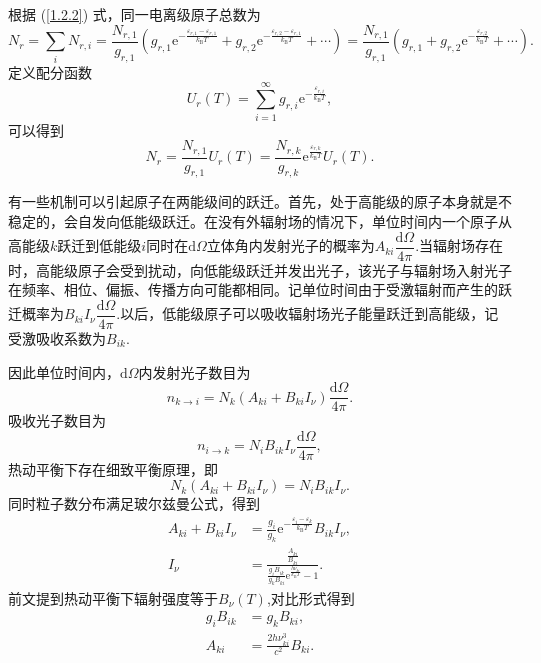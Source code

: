 \documentclass[../天体物理基础.tex]{subfiles}
\begin{document}
根据 (\ref{1.2.2}) 式，同一电离级原子总数为
\begin{equation}
N_{r}=\sum_{i}N_{r,i}=\frac{N_{r,1}}{g_{r,1}}\left(g_{r,1}\mathrm{e}^{-\frac{\varepsilon_{r,1}-\varepsilon_{r,1}}{k_{\text{B}}T}}+g_{r,2}\mathrm{e}^{-\frac{\varepsilon_{r,2}-\varepsilon_{r,1}}{k_{\text{B}}T}}+\cdots\right)=\frac{N_{r,1}}{g_{r,1}}\left(g_{r,1}+g_{r,2}\mathrm{e}^{-\frac{\varepsilon_{r,2}}{k_{\text{B}}T}}+\cdots\right).
\end{equation}
定义配分函数
\begin{equation}
U_r(T)=\sum_{i=1}^\infty g_{r,i}\mathrm{e}^{-\frac{\varepsilon_{r,i}}{k_{\text{B}}T}},
\end{equation}
可以得到
\begin{equation}
N_{r}=\frac{N_{r,1}}{g_{r,1}}U_r(T)=\frac{N_{r,k}}{g_{r,k}}\mathrm{e}^{\frac{\varepsilon_{r,k}}{k_{\text{B}}T}}U_r(T).
\end{equation}

有一些机制可以引起原子在两能级间的跃迁。首先，处于高能级的原子本身就是不稳定的，会自发向低能级跃迁。在没有外辐射场的情况下，单位时间内一个原子从高能级$k$跃迁到低能级$i$同时在$\mathrm{d}\Omega$立体角内发射光子的概率为$A_{ki}\dfrac{\mathrm{d}\Omega}{4\pi}$.当辐射场存在时，高能级原子会受到扰动，向低能级跃迁并发出光子，该光子与辐射场入射光子在频率、相位、偏振、传播方向可能都相同。记单位时间由于受激辐射而产生的跃迁概率为$B_{ki}I_{\nu}\dfrac{\mathrm{d}\Omega}{4\pi}$.以后，低能级原子可以吸收辐射场光子能量跃迁到高能级，记受激吸收系数为$B_{ik}$.

因此单位时间内，$\mathrm{d}\Omega$内发射光子数目为
\begin{equation}
n_{k\to i}=N_k(A_{ki}+B_{ki}I_\nu)\frac{\mathrm{d}\Omega}{4\pi}.
\end{equation}
吸收光子数目为
\begin{equation}
n_{i\to k}=N_iB_{ik}I_\nu\frac{\mathrm{d}\Omega}{4\pi},
\end{equation}
热动平衡下存在细致平衡原理，即
\begin{equation}
N_k(A_{ki}+B_{ki}I_\nu)=N_iB_{ik}I_\nu.
\end{equation}
同时粒子数分布满足玻尔兹曼公式，得到
\begin{align}
A_{ki}+B_{ki}I_\nu&=\frac{g_i}{g_k}\mathrm{e}^{-\frac{\varepsilon_i-\varepsilon_k}{k_{\text{B}}T}}B_{ik}I_\nu,\\
I_\nu&=\frac{\frac{A_{ki}}{B_{ki}}}{\frac{g_iB_{ik}}{g_kB_{ki}}\mathrm{e}^\frac{h\nu_{ki}}{k_{\text{B}}T}-1}.
\end{align}
前文提到热动平衡下辐射强度等于$B_\nu(T)$,对比形式得到
\begin{align}
g_iB_{ik}&=g_kB_{ki},\\
A_{ki}&=\frac{2h\nu_{ki}^3}{c^2}B_{ki}.
\end{align}
\end{document}
